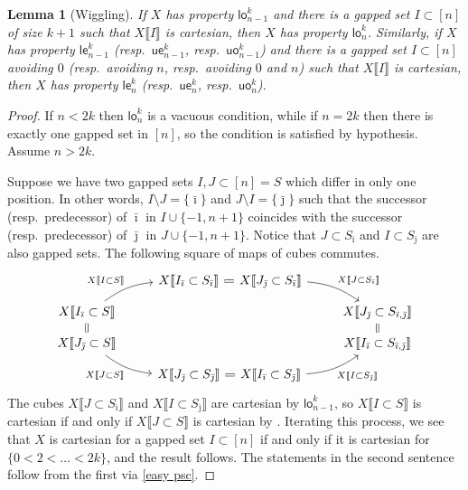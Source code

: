 \documentclass{amsart}
\newcommand{\cube}[1]{\llbracket #1 \rrbracket}
\newcommand{\lowev}{\mathsf{le}}
\newcommand{\lowod}{\mathsf{lo}}
\newcommand{\uppev}{\mathsf{ue}}
\newcommand{\uppod}{\mathsf{uo}}
\newcommand{\bim}{{\bar \imath}}
\newcommand{\bjm}{{\bar \jmath}}
\newtheorem{lemma}[theorem]{Lemma}
\theoremstyle{definition}
\theoremstyle{remark}
\begin{document}
\begin{lemma}[Wiggling]\label{wiggling}
If $X$ has property $\lowod^k_{n-1}$ and there is a gapped set $I \subset [n]$ of size $k+1$ such that $X\cube{I}$ is cartesian, then $X$ has property $\lowod^k_n$.
Similarly, if $X$ has property $\lowev_{n-1}^k$ (resp.\ $\uppev_{n-1}^k$, resp.\ $\uppod_{n-1}^k$) and there is a gapped set %
$I\subset [n]$ avoiding $0$ (resp.\ avoiding $n$, resp.\ avoiding $0$ and $n$) such that $X\cube{I}$ is cartesian, then $X$ has property $\lowev_n^k$ (resp.\ $\uppev_n^k$, resp.\ $\uppod_n^k$).
\end{lemma}
\begin{proof}
If $n < 2k$ then $\lowod^k_n$ is a vacuous condition, while if $n=2k$ then there is exactly one gapped set in $[n]$, so the condition is satisfied by hypothesis. Assume $n > 2k$.

Suppose we have two gapped sets $I, J \subset [n] = S$ which differ in only one position.
In other words, $I\setminus J = \{ \bim \}$ and $J\setminus I = \{ \bjm \}$ such that the successor (resp.\ predecessor) of $\bim$ in $I \cup \{-1, n+1\}$ coincides with the successor (resp.\ predecessor) of $\bjm$ in $J \cup \{-1, n+1\}$.
Notice that $J\subset S_\bim$ and $I \subset S_\bjm$ are also gapped sets.
The following square of maps of cubes commutes.
\[ \begin{tikzcd}[row sep=0.25cm]
& 
X\cube{I_\bim \subset S_\bim} \rar[equals] &[-0.6cm] 
X\cube{J_\bjm \subset S_\bim}
	\drar[bend left=15,"X\cube{J\subset S_\bim}"]
\\
X\cube{I_\bim \subset S} \dar[equals] 
	\urar[bend left=15,"X\cube{I\subset S}"]
& 
&
&
X\cube{J_\bjm \subset S_{\bim,\bjm}} \dar[equals]
\\%
X\cube{J_\bjm \subset S}
	\drar[bend right=15,"X\cube{J\subset S}"']
& 
&
&
X\cube{I_\bim \subset S_{\bim,\bjm}}
\\
& 
X\cube{J_\bjm \subset S_\bjm} \rar[equals] &[-0.6cm] 
X\cube{I_\bim \subset S_\bjm}
	\urar[bend right=15,"X\cube{I\subset S_\bjm}"']
\end{tikzcd} \]
The cubes $X\cube{J\subset S_\bim}$ and $X\cube{I\subset S_\bjm}$ are cartesian by $\lowod^k_{n-1}$, so $X\cube{I\subset S}$ is cartesian if and only if $X\cube{J\subset S}$ is cartesian by \cite[Lemma 3.3]{HackneyLynd:HSSPG}.
Iterating this process, we see that $X$ is cartesian for a gapped set $I \subset [n]$ if and only if it is cartesian for $\{0 < 2 < \dots < 2k \}$, and the result follows.
The statements in the second sentence follow from the first via \cref{easy psc}.
\end{proof}
\end{document}
